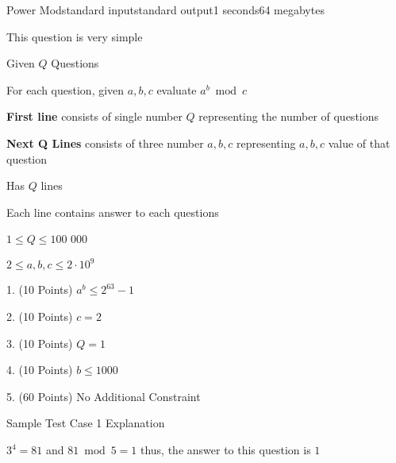 \documentclass[11pt,a4paper]{article}
\begin{document}
\begin{problem}{Power Mod}{standard input}{standard output}{1 seconds}{64 megabytes}

This question is very simple

Given $Q$ Questions

For each question, given $a, b, c$ evaluate $a^b\bmod c$

\InputFile

\textbf{First line} consists of single number $Q$ representing the number of questions

\textbf{Next Q Lines} consists of three number $a,b,c$ representing $a,b,c$ value of that question

\OutputFile
Has $Q$ lines

Each line contains answer to each questions

\Constraints

$1 \le Q \le 100$ $000$

$2 \le a, b, c \le 2\cdot10^{9}$

\Subtasks

1. (10 Points) $a^b \le 2^{63}-1$

2. (10 Points) $c=2$

3. (10 Points) $Q=1$

4. (10 Points) $b \le 1000$

5. (60 Points) No Additional Constraint

\Examples

\begin{example}
%
\end{example}

\Note

Sample Test Case 1 Explanation

$3^4 = 81$ and $81 \bmod 5 = 1$ thus, the answer to this question is $1$

\end{problem}
\end{document}

